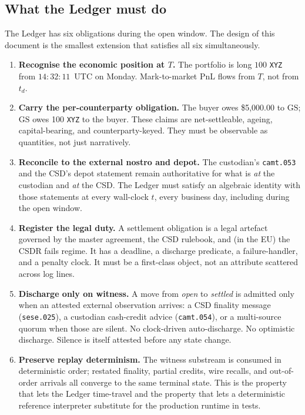 \documentclass[11pt,a4paper]{article}
\begin{document}
\subsection{What the Ledger must do}

The Ledger has six obligations during the open window. The design of this document is the smallest extension that satisfies all six simultaneously.

\begin{enumerate}[nosep]
\item \textbf{Recognise the economic position at $T$.} The portfolio is long $100$ \texttt{XYZ} from $14{:}32{:}11$~UTC on Monday. Mark-to-market PnL flows from $T$, not from $t_d$.
\item \textbf{Carry the per-counterparty obligation.} The buyer owes \$5{,}000.00 to $\mathrm{GS}$; $\mathrm{GS}$ owes 100 \texttt{XYZ} to the buyer. These claims are net-settleable, ageing, capital-bearing, and counterparty-keyed. They must be observable as quantities, not just narratively.
\item \textbf{Reconcile to the external nostro and depot.} The custodian's \texttt{camt.053} and the CSD's depot statement remain authoritative for what is \emph{at} the custodian and \emph{at} the CSD. The Ledger must satisfy an algebraic identity with those statements at every wall-clock $t$, every business day, including during the open window.
\item \textbf{Register the legal duty.} A settlement obligation is a legal artefact governed by the master agreement, the CSD rulebook, and (in the EU) the CSDR fails regime. It has a deadline, a discharge predicate, a failure-handler, and a penalty clock. It must be a first-class object, not an attribute scattered across log lines.
\item \textbf{Discharge only on witness.} A move from \emph{open} to \emph{settled} is admitted only when an attested external observation arrives: a CSD finality message (\texttt{sese.025}), a custodian cash-credit advice (\texttt{camt.054}), or a multi-source quorum when those are silent. No clock-driven auto-discharge. No optimistic discharge. Silence is itself attested before any state change.
\item \textbf{Preserve replay determinism.} The witness substream is consumed in deterministic order; restated finality, partial credits, wire recalls, and out-of-order arrivals all converge to the same terminal state. This is the property that lets the Ledger time-travel and the property that lets a deterministic reference interpreter substitute for the production runtime in tests.
\end{enumerate}
\end{document}
